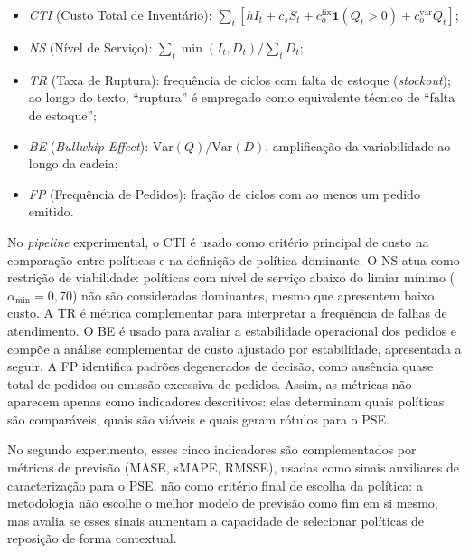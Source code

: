 \begin{itemize}
  \item \textit{CTI} (Custo Total de Inventário): $\sum_{t}[h I_t + c_s S_t + c_o^{\text{fix}}\mathbf{1}(Q_t>0) + c_o^{\text{var}}Q_t]$;
  \item \textit{NS} (Nível de Serviço): $\sum_t \min(I_t, D_t) / \sum_t D_t$;
  \item \textit{TR} (Taxa de Ruptura): frequência de ciclos com falta de estoque (\textit{stockout}); ao longo do texto, ``ruptura'' é empregado como equivalente técnico de ``falta de estoque'';
  \item \textit{BE} (\textit{Bullwhip Effect}): $\mathrm{Var}(Q)/\mathrm{Var}(D)$, amplificação da variabilidade ao longo da cadeia;
  \item \textit{FP} (Frequência de Pedidos): fração de ciclos com ao menos um pedido emitido.
\end{itemize}

No \textit{pipeline} experimental, o CTI é usado como critério principal de custo na comparação entre políticas e na definição de política dominante. O NS atua como restrição de viabilidade: políticas com nível de serviço abaixo do limiar mínimo ($\alpha_{\min}=0{,}70$) não são consideradas dominantes, mesmo que apresentem baixo custo. A TR é métrica complementar para interpretar a frequência de falhas de atendimento. O BE é usado para avaliar a estabilidade operacional dos pedidos e compõe a análise complementar de custo ajustado por estabilidade, apresentada a seguir. A FP identifica padrões degenerados de decisão, como ausência quase total de pedidos ou emissão excessiva de pedidos. Assim, as métricas não aparecem apenas como indicadores descritivos: elas determinam quais políticas são comparáveis, quais são viáveis e quais geram rótulos para o PSE.

No segundo experimento, esses cinco indicadores são complementados por métricas de previsão (MASE, sMAPE, RMSSE), usadas como sinais auxiliares de caracterização para o PSE, não como critério final de escolha da política: a metodologia não escolhe o melhor modelo de previsão como fim em si mesmo, mas avalia se esses sinais aumentam a capacidade de selecionar políticas de reposição de forma contextual.

